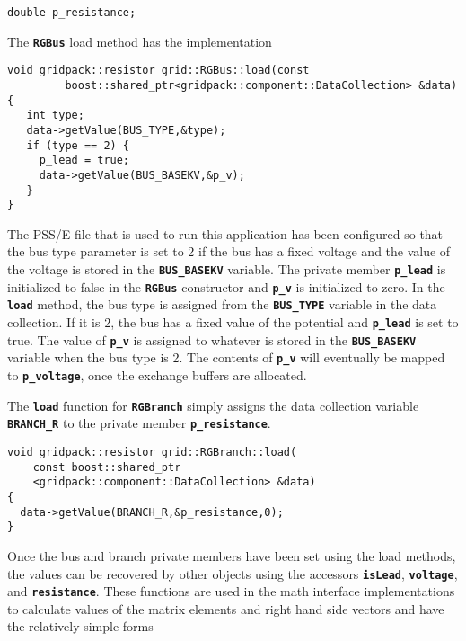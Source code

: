 {
\color{red}
\begin{Verbatim}[fontseries=b]
double p_resistance;
\end{Verbatim}
}

The \texttt{\textbf{RGBus}} load method has the implementation

{
\color{red}
\begin{Verbatim}[fontseries=b]
void gridpack::resistor_grid::RGBus::load(const
         boost::shared_ptr<gridpack::component::DataCollection> &data)
{
   int type;
   data->getValue(BUS_TYPE,&type);
   if (type == 2) {
     p_lead = true;
     data->getValue(BUS_BASEKV,&p_v);
   }
}
\end{Verbatim}
}

The PSS/E file that is used to run this application has been configured so that the bus type parameter is set to 2 if the bus has a fixed voltage and the value of the voltage is stored in the \texttt{\textbf{BUS\_BASEKV}} variable. The private member \texttt{\textbf{p\_lead}} is initialized to false in the \texttt{\textbf{RGBus}} constructor and \texttt{\textbf{p\_v}} is initialized to zero. In the \texttt{\textbf{load}} method, the bus type is assigned from the \texttt{\textbf{BUS\_TYPE}} variable in the data collection. If it is 2, the bus has a fixed value of the potential and \texttt{\textbf{p\_lead}} is set to true. The value of \texttt{\textbf{p\_v}} is assigned to whatever is stored in the \texttt{\textbf{BUS\_BASEKV}} variable when the bus type is 2. The contents of \texttt{\textbf{p\_v}} will eventually be mapped to \texttt{\textbf{p\_voltage}}, once the exchange buffers are allocated.

The \texttt{\textbf{load}} function for \texttt{\textbf{RGBranch}} simply assigns the data collection variable \texttt{\textbf{BRANCH\_R}} to the private member \texttt{\textbf{p\_resistance}}.

{
\color{red}
\begin{Verbatim}[fontseries=b]
void gridpack::resistor_grid::RGBranch::load(
    const boost::shared_ptr
    <gridpack::component::DataCollection> &data)
{
  data->getValue(BRANCH_R,&p_resistance,0);
}
\end{Verbatim}
}

Once the bus and branch private members have been set using the load methods, the values can be recovered by other objects using the accessors \texttt{\textbf{isLead}}, \texttt{\textbf{voltage}}, and \texttt{\textbf{resistance}}. These functions are used in the math interface implementations to calculate values of the matrix elements and right hand side vectors and have the relatively simple forms

